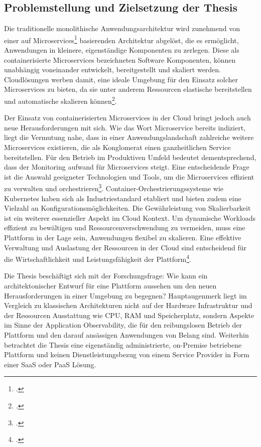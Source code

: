 \subsection{Problemstellung und Zielsetzung der Thesis}
Die traditionelle monolithische Anwendungsarchitektur wird zunehmend von einer auf Microservices\footcite[Vgl.][S.4]{wolff2018microservices} basierenden Architektur abgelöst, die es ermöglicht, Anwendungen in kleinere, eigenständige Komponenten zu zerlegen. Diese als containerisierte Microservices bezeichneten Software Komponenten, können unabhängig voneinander entwickelt, bereitgestellt und skaliert werden. Cloudlösungen werben damit, eine ideale Umgebung für den Einsatz solcher Microservices zu bieten, da sie unter anderem Ressourcen elastische bereitstellen und automatische skalieren können\footcite[Vgl.][S.8-19]{henneberger2016cloud}.

Der Einsatz von containerisierten Microservices in der Cloud bringt jedoch auch neue Herausforderungen mit sich. Wie das Wort Microservice bereits indiziert, liegt die Vermutung nahe, dass in einer Anwendungslandschaft zahlreiche weitere Microservices existieren, die als Konglomerat einen ganzheitlichen Service bereitstellen. Für den Betrieb im Produktiven Umfeld bedeutet dementsprechend, dass der Monitoring aufwand für Microservices steigt. Eine entscheidende Frage ist die Auswahl geeigneter Technologien und Tools, um die Microservices effizient zu verwalten und orchestrieren\footcite[Vgl.][S.12-16]{wolff2018microservices}.
Container-Orchestrierungssysteme wie Kubernetes haben sich als Industriestandard etabliert und bieten zudem eine Vielzahl an Konfigurationsmöglichkeiten. Die Gewährleistung von Skalierbarkeit ist ein weiterer essenzieller Aspekt im Cloud Kontext. Um dynamische Workloads effizient zu bewältigen und Ressourcenverschwendung zu vermeiden, muss eine \cn Plattform in der Lage sein, Anwendungen flexibel zu skalieren. Eine effektive Verwaltung und Auslastung der Ressourcen in der Cloud sind entscheidend für die Wirtschaftlichkeit und Leistungsfähigkeit der Plattform\footcite[Vgl.][o.S.]{k8s2022}.

Die Thesis beschäftigt sich mit der Forschungsfrage: \glqq Wie kann ein architektonischer Entwurf für eine \cn Plattform aussehen um den neuen Herausforderungen in einer \cn Umgebung zu begegnen\grqq? Hauptaugenmerk liegt im Vergleich zu klassischen Architekturen nicht auf der Hardware Infrastruktur und der Ressourcen Ausstattung wie \ac{CPU}, \ac{RAM} und Speicherplatz, sondern Aspekte im Sinne der Application Observability, die für den reibungslosen Betrieb der Plattform und den darauf ansässigen Anwendungen von Belang sind. Weiterhin betrachtet die Thesis eine eigenständig administrierte, on-Premise betriebene Plattform und keinen Dienstleistungsbezug von einem Service Provider in Form einer \ac{SaaS} oder \ac{PaaS} Lösung.

